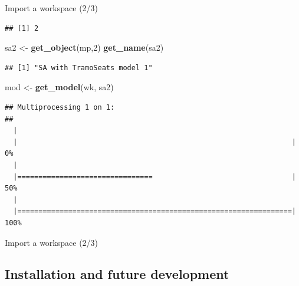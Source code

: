 \documentclass[10pt,xcolor=table,color={dvipsnames,usenames},ignorenonframetext,usepdftitle=false,french]{beamer}
\newenvironment{Shaded}{\begin{snugshade}}{\end{snugshade}}
\newcommand{\DecValTok}[1]{\textcolor[rgb]{0.00,0.00,0.81}{#1}}
\newcommand{\KeywordTok}[1]{\textcolor[rgb]{0.13,0.29,0.53}{\textbf{#1}}}
\newcommand{\NormalTok}[1]{#1}
\newcommand{\StringTok}[1]{\textcolor[rgb]{0.31,0.60,0.02}{#1}}
\begin{document}
\begin{frame}[fragile]{Import a workspace (2/3)}
\begin{verbatim}
## [1] 2
\end{verbatim}

\begin{Shaded}
\begin{Highlighting}[]
\NormalTok{sa2 <-}\StringTok{ }\KeywordTok{get_object}\NormalTok{(mp,}\DecValTok{2}\NormalTok{)}
\KeywordTok{get_name}\NormalTok{(sa2)}
\end{Highlighting}
\end{Shaded}

\begin{verbatim}
## [1] "SA with TramoSeats model 1"
\end{verbatim}

\begin{Shaded}
\begin{Highlighting}[]
\NormalTok{mod <-}\StringTok{ }\KeywordTok{get_model}\NormalTok{(wk, sa2)}
\end{Highlighting}
\end{Shaded}

\begin{verbatim}
## Multiprocessing 1 on 1:
## 
  |                                                                       
  |                                                                 |   0%
  |                                                                       
  |================================                                 |  50%
  |                                                                       
  |=================================================================| 100%
\end{verbatim}

\end{frame}

\begin{frame}{Import a workspace (2/3)}
\protect\hypertarget{import-a-workspace-23-1}{}


\end{frame}

\hypertarget{installation-and-future-development}{%
\subsection{Installation and future
development}\label{installation-and-future-development}}
\end{document}
